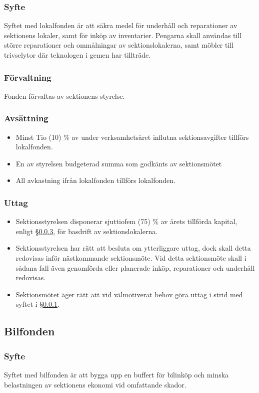 \documentclass[a4paper, 10pt]{article}
\begin{document}
\subsubsection{Syfte}
\label{sec:lokalfond_syfte}
Syftet med lokalfonden är att säkra medel för underhåll och reparationer av sektionens lokaler, samt för inköp av inventarier. Pengarna skall användas till större reparationer och ommålningar av sektionslokalerna, samt möbler till trivselytor där teknologen i gemen har tillträde.
\subsubsection{Förvaltning}
Fonden förvaltas av sektionens styrelse.
\subsubsection{Avsättning}
\label{sec:lokalfond_avsattning}
\begin{itemize}
\item Minst Tio (10) \% av under verksamhetsåret influtna sektionsavgifter tillförs lokalfonden.
\item En av styrelsen budgeterad summa som godkänts av sektionsmötet
\item All avkastning ifrån lokalfonden tillförs lokalfonden.
\end{itemize}
\subsubsection{Uttag}
\begin{itemize}
\item Sektionsstyrelsen disponerar sjuttiofem (75) \% av årets tillförda kapital,
enligt \S\ref{sec:lokalfond_avsattning}, för basdrift av sektionslokalerna. 
\item Sektionsstyrelsen har rätt att besluta om ytterliggare uttag, dock skall detta redovisas inför nästkommande sektionsmöte. Vid detta sektionsmöte skall i sådana fall även genomförda eller planerade inköp, reparationer och underhåll redovisas.
\item Sektionsmötet äger rätt att vid välmotiverat behov göra uttag i strid med syftet i \S\ref{sec:lokalfond_syfte}.
\end{itemize}

\subsection{Bilfonden}
\subsubsection{Syfte}
\label{sec:bilfond_syfte}
Syftet med bilfonden är att bygga upp en buffert för bilinköp och minska belastningen av sektionens ekonomi vid omfattande skador.
\end{document}
